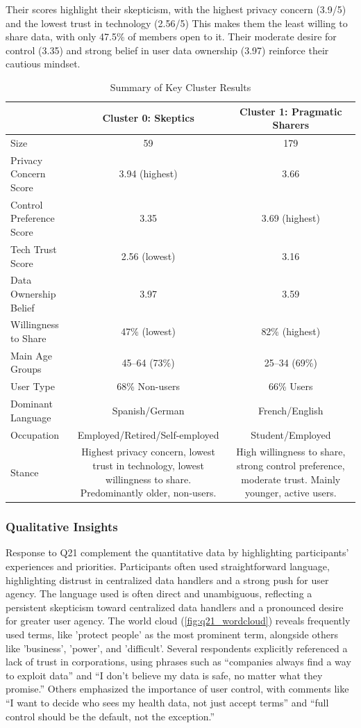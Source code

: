 Their scores highlight their skepticism, with the highest privacy concern (3.9/5) and the lowest trust in technology (2.56/5) This makes them the least willing to share data, with only 47.5\% of members open to it. Their moderate desire for control (3.35) and strong belief in user data ownership (3.97) reinforce their cautious mindset.

\begin{table}[ht] 
	\caption{Summary of Key Cluster Results}
	\centering
	\begin{tabular}{lcc}
		\toprule
		& \textbf{Cluster 0: Skeptics} & \textbf{Cluster 1: Pragmatic Sharers} \\
		\midrule
		Size & 59 & 179 \\
		Privacy Concern Score & 3.94 (highest) & 3.66 \\
		Control Preference Score & 3.35 & 3.69 (highest) \\
		Tech Trust Score & 2.56 (lowest) & 3.16 \\
		Data Ownership Belief & 3.97 & 3.59 \\
		Willingness to Share & 47\% (lowest) & 82\% (highest) \\
		Main Age Groups & 45--64 (73\%) & 25--34 (69\%) \\
		User Type & 68\% Non-users & 66\% Users \\
		Dominant Language & Spanish/German & French/English \\
		Occupation & Employed/Retired/Self-employed & Student/Employed \\
		\midrule
		Stance & \parbox{6cm}{Highest privacy concern, lowest trust in technology, lowest willingness to share. Predominantly older, non-users.} & \parbox{6cm}{High willingness to share, strong control preference, moderate trust. Mainly younger, active users.} \\
		\bottomrule
	\end{tabular}
	\label{tab:cluster_summary_brief}
\end{table}
	\subsubsection{Qualitative Insights}
		Response to Q21 complement the quantitative data by highlighting participants' experiences and priorities. Participants often used straightforward language, highlighting distrust in centralized data handlers and a strong push for user agency. The language used is often direct and unambiguous, reflecting a persistent skepticism toward centralized data handlers and a pronounced desire for greater user agency.
		The world cloud (\autoref{fig:q21_wordcloud}) reveals frequently used terms, like 'protect people' as the most prominent term, alongside others like 'business', 'power', and 'difficult'. Several respondents explicitly referenced a lack of trust in corporations, using phrases such as “companies always find a way to exploit data” and “I don’t believe my data is safe, no matter what they promise.” Others emphasized the importance of user control, with comments like “I want to decide who sees my health data, not just accept terms” and “full control should be the default, not the exception.”
		
